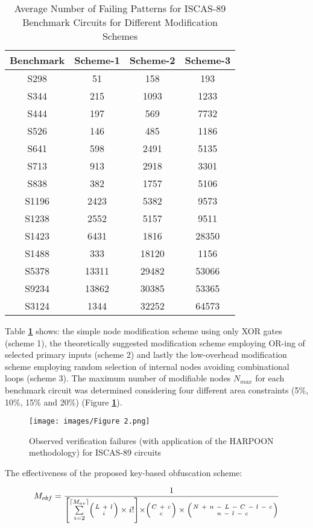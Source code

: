 \documentclass{optica-article}
\begin{document}
\begin{table}[H]
    \centering
    \caption{Average Number of Failing Patterns for ISCAS-89 Benchmark Circuits for Different Modification Schemes}
    \begin{tabular}{|c|c|c|c|}
        \hline
        Benchmark & Scheme-1 & Scheme-2 & Scheme-3 \\\hline
        S298 & 51 & 158 & 193 \\\hline
        S344 & 215 & 1093 & 1233 \\\hline
        S444 & 197 & 569 & 7732 \\\hline
        S526 & 146 & 485 & 1186 \\\hline
        S641 & 598 & 2491 & 5135 \\\hline
        S713 & 913 & 2918 & 3301 \\\hline
        S838 & 382 & 1757 & 5106 \\\hline
        S1196 & 2423 & 5382 & 9573 \\\hline
        S1238 & 2552 & 5157 & 9511 \\\hline
        S1423 & 6431 & 1816 & 28350 \\\hline
        S1488 & 333 & 18120 & 1156 \\\hline
        S5378 & 13311 & 29482 & 53066 \\\hline
        S9234 & 13862 & 30385 & 53365 \\\hline
        S3124 & 1344 & 32252 & 64573 \\\hline
    \end{tabular}
    \label{tab:Table 1}
\end{table}


Table \textbf{\ref{tab:Table 1}} shows: the simple node modification scheme using only XOR gates (scheme 1), the theoretically suggested modification scheme employing OR-ing of selected primary inputs (scheme 2) and lastly the low-overhead modification scheme employing random selection of internal nodes avoiding combinational loops (scheme 3). The maximum number of modifiable nodes $N_{max}$ for each benchmark circuit was determined considering four different area constraints (5\%, 10\%, 15\% and 20\%) (Figure \textbf{\ref{fig:Figure 2}}).


\begin{figure}[H]
    \centering
    \texttt{[image: images/Figure 2.png]}
    \caption{Observed verification failures (with application of the HARPOON methodology) for ISCAS-89 circuits}
    \label{fig:Figure 2}
\end{figure}

\indent The effectiveness of the proposed key-based obfuscation scheme:

\begin{equation} %
    \label{equation:5} 
    M_{obf}=\frac{1}{\Biggl[ \sum\limits_{i=2}^{\lceil M_{av}\rceil} \Bigl(\genfrac{}{}{0pt}{}{L\ +\ l}{i} \Bigr)\times i! \Biggl]\times\Bigl(\genfrac{}{}{0pt}{}{C\ +\ c}{c} \Bigr)\times\Bigl(\genfrac{}{}{0pt}{}{N\ +\ n\ -\ L\ -\ C\ -\ l\ -\ c
}{n\ -\ l\ -\ c} \Bigr)}
\end{equation}
\end{document}
